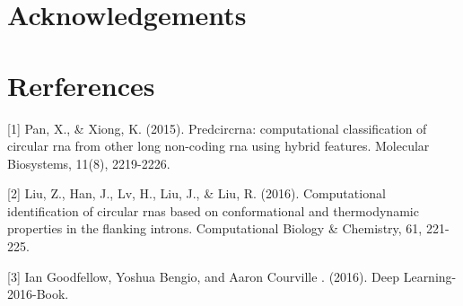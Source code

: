 \documentclass[10pt,a4paper]{article}
\begin{document}
\begin{spacing}{1.5}
\section*{Acknowledgements}

\newpage

\section*{Rerferences}

[1] Pan, X., \& Xiong, K. (2015). Predcircrna: computational classification of circular rna from other long non-coding rna using hybrid features. Molecular Biosystems, 11(8), 2219-2226.

[2] Liu, Z., Han, J., Lv, H., Liu, J., \& Liu, R. (2016). Computational identification of circular rnas based on conformational and thermodynamic properties in the flanking introns. Computational Biology \& Chemistry, 61, 221-225.

[3] Ian Goodfellow, Yoshua Bengio, and Aaron Courville . (2016). Deep Learning-2016-Book.

\end{spacing}
\end{document}
